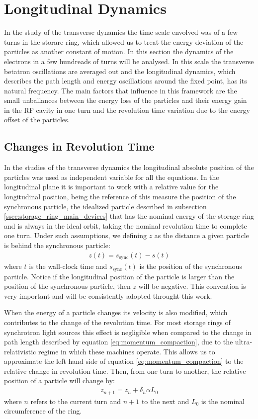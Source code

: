\documentclass[
	12pt,				%
	openright,			%
	oneside,			%
	a4paper,		%
	chapter=TITLE,		%
	section=TITLE,		%
    brazil,				%
	english,			%
	sumario=tradicional,
	]{abntex2}
\begin{document}
  \section{Longitudinal Dynamics}

  In the study of the transverse dynamics the time scale envolved was of a few turns in the storare ring, which allowed us to treat the energy deviation of the particles as another constant of motion. In this section the dynamics of the electrons in a few hundreads of turns will be analysed. In this scale the transverse betatron oscillations are averaged out and the longitudinal dynamics, which describes the path length and energy oscillations around the fixed point, has its natural frequency. The main factors that influence in this framework are the small unballances between the energy loss of the particles and their energy gain in the RF cavity in one turn and the revolution time variation due to the energy offset of the particles.

    \subsection{Changes in Revolution Time}

	In the studies of the transverse dynamics the longitudinal absolute position of the particles was used as independent variable for all the equations. In the longitudinal plane it is important to work with a relative value for the longitudinal position, being the reference of this measure the position of the synchronous particle, the idealized particle described in subsection \ref{ssec:storage_ring_main_devices} that has the nominal energy of the storage ring and is always in the ideal orbit, taking the nominal revolution time to complete one turn. Under such assumptions, we defining $z$ as the distance a given particle is behind the synchronous particle:
	\begin{align}
		z(t) = s_\text{sync}(t) - s(t)
	\end{align}
	where $t$ is the wall-clock time and $s_\text{sync}(t)$ is the position of the synchronous particle. Notice if the longitudinal position of the particle is larger than the position of the synchronous particle, then $z$ will be negative. This convention is very important and will be consistently adopted throught this work.

    When the energy of a particle changes its velocity is also modified, which contributes to the change of the revolution time. For most storage rings of synchrotron light sources this effect is negligible when compared to the change in path length described by equation \eqref{eq:momentum_compaction}, due to the ultra-relativistic regime in which these machines operate. This allows us to approximate the left hand side of equation \eqref{eq:momentum_compaction} to the relative change in revolution time. Then, from one turn to another, the relative position of a particle will change by:
	\begin{align}\label{eq:revolution_time_variation}
		z_{n+1} = z_n + \delta_n\alpha L_0
	\end{align}
	where $n$ refers to the current turn and $n+1$ to the next and $L_0$ is the nominal circumference of the ring.
\end{document}
